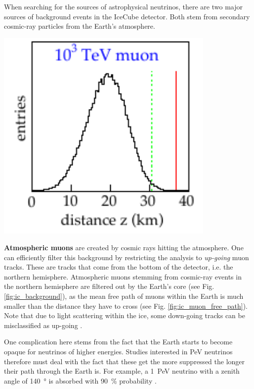 \documentclass[
    a4paper, %
    fontsize=10pt, %
    twoside=false, %
    numbers=noenddot, %
    fontmethod=tex,
]{kaobook}
\begin{document}
When searching for the sources of astrophysical neutrinos, there are two major sources of background events in the IceCube detector. Both stem from secondary cosmic-ray particles from the Earth's atmosphere.

\begin{marginfigure}
    \includegraphics[width=0.8\textwidth]{ic/ic_muon_free_path.pdf}
    \caption[Muon free path in ice]{Free path length for \SI{1}{\peta\eV} muons in ice. The mean free path in ice is slightly longer than in rock. From \cite{Chirkin2004}.}
\end{marginfigure}

\textbf{Atmospheric muons} are created by cosmic rays hitting the atmosphere. One can efficiently filter this background by restricting the analysis to \textit{up-going} muon tracks. These are tracks that come from the bottom of the detector, i.e. the northern hemisphere. Atmospheric muons stemming from cosmic-ray events in the northern hemisphere are filtered out by the Earth's core (see Fig. \ref{fig:ic_background}), as the mean free path of muons within the Earth is much smaller  than the distance they have to cross (see Fig. \ref{fig:ic_muon_free_path}). Note that due to light scattering within the ice, some down-going tracks can be misclassified as up-going .

One complication here stems from the fact that the Earth starts to become opaque for neutrinos of higher energies. Studies interested in \si{\peta\eV} neutrinos therefore must deal with the fact that these get the more suppressed the longer their path through the Earth is. For example, a \SI{1}{\peta\eV} neutrino with a zenith angle of \SI{140}{\degree} is absorbed with \SI{90}{\percent} probability .
\end{document}
